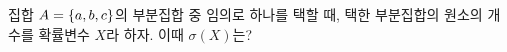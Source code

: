 집합 $A=\{a{,}\mkern3mu\mathopen{}b{,}\mkern3mu\mathopen{}c\}$의 부분집합 중 임의로 하나를 택할 때, 택한 부분집합의 원소의 개수를 확률변수 $X$라 하자. 이때 $\sigma(X)$는?
